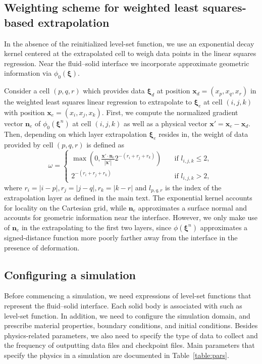 \documentclass[times, 10pt]{article}
\renewcommand{\vec}[1]{\mathbf{#1}}
\newcommand{\nor}{\vec{n}}
\newcommand{\vx}{\vec{x}}
\newcommand{\vxi}{\boldsymbol\xi}
\begin{document}
\subsection{Weighting scheme for weighted least squares-based extrapolation}
In the absence of the reinitialized level-set function, we use an exponential decay kernel centered at the extrapolated cell to weigh data points in the linear squares regression.
Near the fluid--solid interface we incorporate approximate geometric information via $\phi_0(\vxi)$.

Consider a cell $(p,q,r)$ which provides data $\vxi_d$ at position $\vx_d=(x_p, x_q, x_r)$ in the weighted least squares linear regression to extrapolate
to $\vxi_e$ at cell $(i,j,k)$ with position $\vx_e = (x_i, x_j, x_k)$.
First, we compute the normalized gradient vector $\nor_e$ of $\phi_0(\vxi^n)$ at cell $(i,j,k)$
as well as a physical vector $\vx' = \vx_e - \vx_d$.
Then, depending on which layer extrapolation $\vxi_e$ resides in, the weight of data provided by cell $(p,q,r)$ is defined as
\begin{equation}
\label{eq:weight}
\omega=
\left \{
  \begin{array}{ll}
   \max\left( 0, \frac{\vx' \cdot \nor_e}{|\vx'|} {2 ^{- (r_i + r_j + r_k)}} \right) & \quad \text{if $l_{i, j, k}\le2$, } \\
    {2 ^{- (r_i + r_j + r_k)}} &  \quad \text{if $l_{i, j, k}>2$,}
  \end{array}
  \right.
\end{equation}
where $r_i = |i-p|, r_j=|j-q|, r_k = |k-r|$ and $l_{p,q,r}$ is the index of the extrapolation layer as defined in the main text.
The exponential kernel accounts for locality on the Cartesian grid,
while $\nor_e$ approximates a surface normal and accounts for geometric information near the interface.
However, we only make use of $\nor_e$ in the extrapolating to the first two layers,
since $\phi (\vxi^n)$ approximates a signed-distance function more poorly farther away from the interface in the presence of deformation.

\subsection{Configuring a simulation}
\label{sub:setup}
Before commencing a simulation, we need expressions of level-set functions that represent the fluid--solid interface.
Each solid body is associated with such as level-set function.
In addition, we need to configure the simulation domain, and prescribe material properties, boundary conditions, and initial conditions.
Besides physics-related parameters, we  also need to specify the type of data to collect and the frequency of outputting data files and checkpoint files.
Main parameters that specify the physics in a simulation are documented in Table~\ref{table:pars}.
\end{document}
